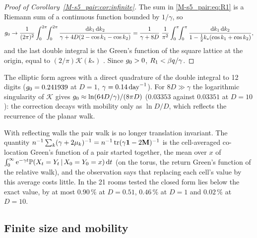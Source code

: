 \begin{proof}[Proof of Corollary~\ref{M-s5_pair:cor:infinite}]
The sum in \eqref{M-s5_pair:eq:R1} is a Riemann sum of a continuous function bounded by $1/\gamma$, so
\[
  g_0\to\frac{1}{(2\pi)^2}\int_0^{2\pi}\!\!\int_0^{2\pi}\frac{\mathrm{d} k_1\,\mathrm{d} k_2}{\gamma+4D(2-\cos k_1-\cos k_2)}
  =\frac{1}{\gamma+8D}\;\frac{1}{\pi^2}\int_0^{\pi}\!\!\int_0^{\pi}
  \frac{\mathrm{d} k_1\,\mathrm{d} k_2}{1-\tfrac12k_*(\cos k_1+\cos k_2)} ,
\]
and the last double integral is the Green's function of the square lattice at the origin, equal to
$(2/\pi)\mathcal{K}(k_*)$ \citep{montroll1965random}. Since $g_0>0$, $R_1<\beta q/\gamma$.
\end{proof}

The elliptic form agrees with a direct quadrature of the double integral to 12 digits ($g_0=0.241939$ at
$D=1$, $\gamma=0.14\,\mathrm{day}^{-1}$). For $8D\gg\gamma$ the logarithmic singularity of $\mathcal{K}$ gives
$g_0\approx\ln(64D/\gamma)/(8\pi D)$ ($0.03353$ against $0.03351$ at $D=10$): the correction decays with
mobility only as $\ln D/D$, which reflects the recurrence of the planar walk.

With reflecting walls the pair walk is no longer translation invariant. The quantity
$n^{-1}\sum_k(\gamma+2\mu_k)^{-1}=n^{-1}\operatorname{tr}(\gamma\mathbf{1}-2\mathbf{M})^{-1}$ is the
cell-averaged co-location Green's function of a pair started together, the mean over $x$ of
$\int_0^\infty\mathrm{e}^{-\gamma t}\mathbb{P}(X_t=Y_t\,|\,X_0=Y_0=x)\,\mathrm{d} t$ (on the torus, the return Green's function of the
relative walk), and the observation says that replacing each
cell's value by this average costs little. In the 21 rooms tested the closed form lies below the exact value,
by at most $0.90\,\%$ at $D=0.51$, $0.46\,\%$ at $D=1$ and $0.02\,\%$ at $D=10$.

\subsection{Finite size and mobility}

